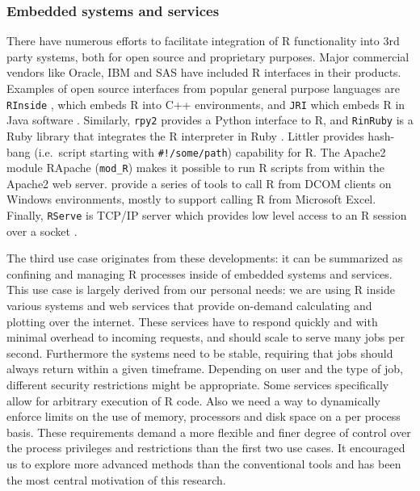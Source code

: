 \documentclass{jss}
\newcommand{\R}{\textsf{R}\xspace}
\newcommand{\Java}{\textsf{Java}\xspace}
\newcommand{\Cpp}{\textsf{C++}\xspace}
\newcommand{\Python}{\textsf{Python}\xspace}
\newcommand{\Ruby}{\textsf{Ruby}\xspace}
\begin{document}
\subsubsection{Embedded systems and services}

There have numerous efforts to facilitate integration of \R functionality into
3rd party systems, both for open source and proprietary purposes. Major
commercial vendors like Oracle, IBM and SAS have included R interfaces in their
products. Examples of open source interfaces from popular general purpose
languages are \texttt{RInside} \citep{RInside}, which embeds \R into \Cpp
environments, and \texttt{JRI} which embeds \R in \Java software
\citep{JRI,urbanek2007rjava}. Similarly, \texttt{rpy2}
\citep{moreira2006rpy,gautier2008rpy2} provides a \Python interface to \R, and \texttt{RinRuby} is a \Ruby library that integrates the \R interpreter in Ruby
\citep{dahl2008rinruby}. Littler provides hash-bang (i.e.\ script starting with
\texttt{\#!/some/path}) capability for \R \citep{littler}. The Apache2 module
RApache  (\texttt{mod\_R}) \citep{rapache} makes it possible to run \R scripts
from within the Apache2 web server. \cite{heiberger2009r} provide a series of
tools to call \R from DCOM clients on Windows environments, mostly to support
calling \R from Microsoft Excel. Finally, \texttt{RServe} is TCP/IP server
which provides low level access to an \R session over a socket \citep{Rserve}.

The third use case originates from these developments: it can be summarized as
confining and managing \R processes inside of embedded systems and services.
This use case is largely derived from our personal needs: we are using \R
inside various systems and web services that provide on-demand calculating and
plotting over the internet. These services have to respond quickly and with
minimal overhead to incoming requests, and should scale to serve many jobs per
second. Furthermore the systems need to be stable, requiring that jobs should
always return within a given timeframe. Depending on user and the type of job,
different security restrictions might be appropriate. Some services specifically allow
for arbitrary execution of \R code. Also we need a way to
dynamically enforce limits on the use of memory, processors and disk space on a
per process basis. These requirements demand a more flexible and finer degree
of control over the process privileges and restrictions than the first two use
cases. It encouraged us to explore more advanced methods than the conventional
tools and has been the most central motivation of this research.
\end{document}
